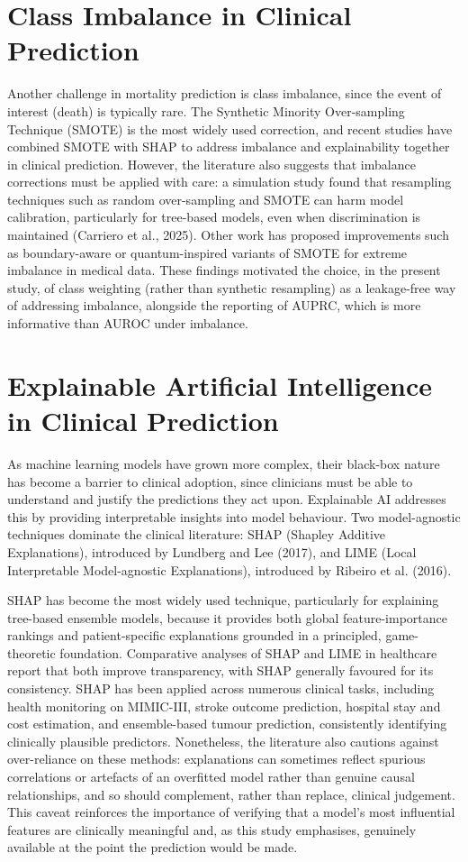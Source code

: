 \documentclass[12pt,a4paper]{report}
\begin{document}
\section{Class Imbalance in Clinical Prediction}
Another challenge in mortality prediction is class imbalance, since the event of interest (death) is typically rare. The Synthetic Minority Over-sampling Technique (SMOTE) is the most widely used correction, and recent studies have combined SMOTE with SHAP to address imbalance and explainability together in clinical prediction. However, the literature also suggests that imbalance corrections must be applied with care: a simulation study found that resampling techniques such as random over-sampling and SMOTE can harm model calibration, particularly for tree-based models, even when discrimination is maintained (Carriero et al., 2025). Other work has proposed improvements such as boundary-aware or quantum-inspired variants of SMOTE for extreme imbalance in medical data. These findings motivated the choice, in the present study, of class weighting (rather than synthetic resampling) as a leakage-free way of addressing imbalance, alongside the reporting of AUPRC, which is more informative than AUROC under imbalance.


\section{Explainable Artificial Intelligence in Clinical Prediction}
As machine learning models have grown more complex, their black-box nature has become a barrier to clinical adoption, since clinicians must be able to understand and justify the predictions they act upon. Explainable AI addresses this by providing interpretable insights into model behaviour. Two model-agnostic techniques dominate the clinical literature: SHAP (Shapley Additive Explanations), introduced by Lundberg and Lee (2017), and LIME (Local Interpretable Model-agnostic Explanations), introduced by Ribeiro et al. (2016).

SHAP has become the most widely used technique, particularly for explaining tree-based ensemble models, because it provides both global feature-importance rankings and patient-specific explanations grounded in a principled, game-theoretic foundation. Comparative analyses of SHAP and LIME in healthcare report that both improve transparency, with SHAP generally favoured for its consistency. SHAP has been applied across numerous clinical tasks, including health monitoring on MIMIC-III, stroke outcome prediction, hospital stay and cost estimation, and ensemble-based tumour prediction, consistently identifying clinically plausible predictors. Nonetheless, the literature also cautions against over-reliance on these methods: explanations can sometimes reflect spurious correlations or artefacts of an overfitted model rather than genuine causal relationships, and so should complement, rather than replace, clinical judgement. This caveat reinforces the importance of verifying that a model's most influential features are clinically meaningful and, as this study emphasises, genuinely available at the point the prediction would be made.
\end{document}
